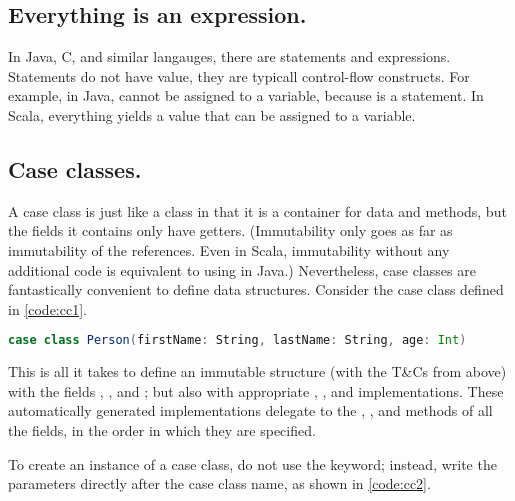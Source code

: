 \documentclass[10 pt]{article}
\begin{document}
\subsection{Everything is an expression.} 
In Java, C, and similar langauges, there are statements and expressions. Statements do not have value, they are typicall control-flow constructs. For example, in Java,  cannot be assigned to a variable, because  is a statement. In Scala, everything yields a value that can be assigned to a variable. 

\subsection{Case classes.} A case class is just like a class in that it is a container for data and methods, but the fields it contains only have getters. (Immutability only goes as far as immutability of the references. Even in Scala, immutability without any additional code is equivalent to using  in Java.) Nevertheless, case classes are fantastically convenient to define data structures. Consider the  case class defined in \autoref{code:cc1}.

\begin{lstlisting}[caption={Case class \pcode{Person}}, label={code:cc1}, language=Scala, escapechar=|]
case class Person(firstName: String, lastName: String, age: Int)
\end{lstlisting}

This is all it takes to define an immutable structure (with the T\&Cs from above) with the fields , , and ; but also with appropriate , , and  implementations. These automatically generated implementations delegate to the , , and  methods of all the fields, in the order in which they are specified.

To create an instance of a case class, do not use the  keyword; instead, write the parameters directly after the case class name, as shown in \autoref{code:cc2}.
\end{document}
